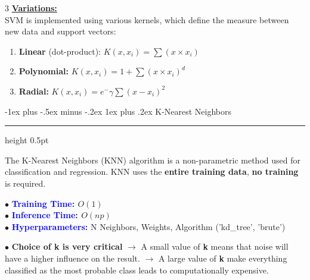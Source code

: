 \documentclass[letterpaper, 10.5pt,landscape]{article}
\makeatletter
\renewcommand{\subsubsection}{\@startsection{subsubsection}{3}{0mm}%
                                {-1ex plus -.5ex minus -.2ex}%
                                {1ex plus .2ex}%
                                {\normalfont\small\bfseries}}
\makeatother
\begin{document}
\begin{multicols*}{3}
\vspace{3pt}
\textbf{\underline{Variations:}} \\
SVM is implemented using various kernels, which define the
measure between new data and support vectors:
\vspace{-3pt}
\begin{enumerate}
    \item \textbf{Linear} (dot-product):  \hspace{5pt} \(\boxed{K(x, x_{i}) = \sum(x \times x_{i})} \)
    \vspace{-3pt}
    \item \textbf{Polynomial:}  \hspace{38pt} \( \boxed{K(x, x_{i}) = 1 + \sum(x \times x_{i})^{d} }\)
    \vspace{-3pt}
    \item \textbf{Radial:}  \hspace{55pt} \(\boxed{K(x, x_{i}) = e^-{\gamma \sum (x - x_{i})^{2}}}\)
\end{enumerate}







\vspace*{\fill}

\columnbreak




\subsubsection{K-Nearest Neighbors} {\color{teal}\hrule height 0.5pt} \smallskip

The K-Nearest Neighbors (KNN) algorithm is a non-parametric method used for classification and regression. KNN uses the \textbf{entire training data}, \textbf{no training} is required. 

\vspace{3pt}
$\bullet$ \textbf{\textcolor{blue}{Training Time}: \(O(1)\)}  \\
$\bullet$ \textbf{\textcolor{blue}{Inference Time}: \(O(np)\)}  \\
$\bullet$ \textbf{\textcolor{blue}{Hyperparameters}:}  N Neighbors, Weights, Algorithm ('kd\_tree', 'brute')


$\bullet$ \textbf{Choice of \textbf{k} is very critical} $\rightarrow$ A small value of \textbf{k} means that noise will have a higher influence on the result. 
$\rightarrow$ A large value of \textbf{k} make everything classified as the most probable class leads to computationally expensive.


\end{multicols*}
\end{document}
